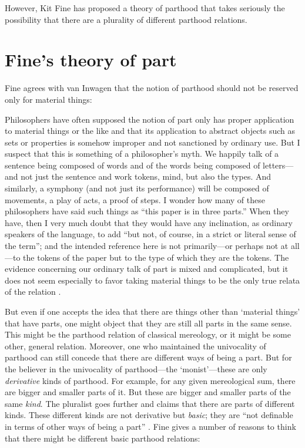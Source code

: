 \documentclass[11pt]{article}
\newenvironment{squote}{%
\begin{spacing}{1}
\begin{list}{}{%
\setlength{\labelwidth}{0pt}%
\rightmargin\leftmargin%
}
\item\relax
}{%
\end{list}%
\end{spacing}
}
\begin{document}
\begin{spacing}{1.5}
However, Kit Fine has proposed a theory of parthood that takes
seriously the possibility that there are a plurality of different
parthood relations.

\section{Fine's theory of part}
\label{fine}
Fine agrees with van Inwagen that the notion of parthood should not be
reserved only for material things:

\begin{squote}
Philosophers have often supposed the notion of part only has proper
application to material things or the like and that its application
to abstract objects such as sets or properties is somehow improper
and not sanctioned by ordinary use.  But I suspect that this is
something of a philosopher’s myth.  We happily talk of a sentence
being composed of words and of the words being composed of
letters---and not just the sentence and work tokens, mind, but also
the types.  And similarly, a symphony (and not just its performance)
will be composed of movements, a play of acts, a proof of steps.  I
wonder how many of these philosophers have said such things as ``this
paper is in three parts.''  When they have, then I very much doubt
that they would have any inclination, as ordinary speakers of the
language, to add ``but not, of course, in a strict or literal sense of
the term''; and the intended reference here is not primarily---or
perhaps not at all---to the tokens of the paper but to the type of
which they are the tokens.  The evidence concerning our ordinary talk
of part is mixed and complicated, but it does not seem especially to
favor taking material things to be the only true relata of the
relation \citeyearpar[561]{fine2010}.
\end{squote}

But even if one accepts the idea that there are things other than
`material things' that have parts, one might object that they are
still all parts in the same sense.  This might be the parthood
relation of classical mereology, or it might be some other, general
relation.  Moreover, one who maintained the univocality of parthood
can still concede that there are different ways of being a part.  But
for the believer in the univocality of parthood---the `monist'---these
are only {\em derivative} kinds of parthood.  For example, for any
given mereological sum, there are bigger and smaller parts of it. But
these are bigger and smaller parts of the same {\em kind}.  The
pluralist goes further and claims that there are parts of different
kinds. These different kinds are not derivative but \emph{basic}; they
are ``not definable in terms of other ways of being a part''
\citep[561]{fine2010}.  Fine gives a number of reasons to think that
there might be different basic parthood relations:


\end{spacing}
\end{document}
